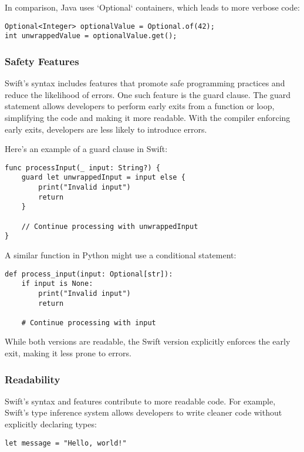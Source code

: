 In comparison, Java uses `Optional` containers, which leads to more verbose code:

\begin{verbatim}
Optional<Integer> optionalValue = Optional.of(42);
int unwrappedValue = optionalValue.get();
\end{verbatim}

\subsubsection{Safety Features}
Swift's syntax includes features that promote safe programming practices and reduce the likelihood of errors. One such feature is the guard clause. The guard statement allows developers to perform early exits from a function or loop, simplifying the code and making it more readable. With the compiler enforcing early exits, developers are less likely to introduce errors.

Here's an example of a guard clause in Swift:

\begin{verbatim}
func processInput(_ input: String?) {
    guard let unwrappedInput = input else {
        print("Invalid input")
        return
    }
    
    // Continue processing with unwrappedInput
}
\end{verbatim}

A similar function in Python might use a conditional statement:

\begin{verbatim}
def process_input(input: Optional[str]):
    if input is None:
        print("Invalid input")
        return

    # Continue processing with input
\end{verbatim}

While both versions are readable, the Swift version explicitly enforces the early exit, making it less prone to errors.

\subsubsection{Readability}
Swift's syntax and features contribute to more readable code. For example, Swift's type inference system allows developers to write cleaner code without explicitly declaring types:

\begin{verbatim}
let message = "Hello, world!"
\end{verbatim}


